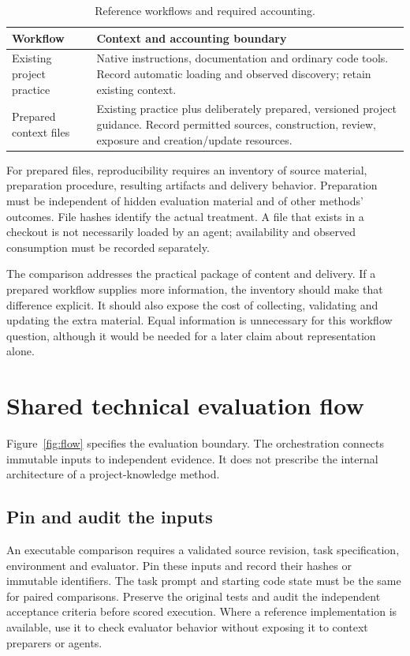 \documentclass[11pt,letterpaper,twocolumn]{article}
\begin{document}
\begin{table}[t]
\caption{Reference workflows and required accounting.}
\label{tab:workflows}
\small
\begin{tabularx}{\columnwidth}{@{}p{}Y@{}}
\toprule
Workflow & Context and accounting boundary \\
\midrule
Existing project practice & Native instructions, documentation and ordinary code tools. Record automatic loading and observed discovery; retain existing context. \\
\addlinespace
Prepared context files & Existing practice plus deliberately prepared, versioned project guidance. Record permitted sources, construction, review, exposure and creation/update resources. \\
\bottomrule
\end{tabularx}
\end{table}

For prepared files, reproducibility requires an inventory of source material, preparation procedure, resulting artifacts and delivery behavior. Preparation must be independent of hidden evaluation material and of other methods' outcomes. File hashes identify the actual treatment. A file that exists in a checkout is not necessarily loaded by an agent; availability and observed consumption must be recorded separately.

The comparison addresses the practical package of content and delivery. If a prepared workflow supplies more information, the inventory should make that difference explicit. It should also expose the cost of collecting, validating and updating the extra material. Equal information is unnecessary for this workflow question, although it would be needed for a later claim about representation alone.

\section{Shared technical evaluation flow}
Figure~\ref{fig:flow} specifies the evaluation boundary. The orchestration connects immutable inputs to independent evidence. It does not prescribe the internal architecture of a project-knowledge method.



\subsection{Pin and audit the inputs}
An executable comparison requires a validated source revision, task specification, environment and evaluator. Pin these inputs and record their hashes or immutable identifiers. The task prompt and starting code state must be the same for paired comparisons. Preserve the original tests and audit the independent acceptance criteria before scored execution. Where a reference implementation is available, use it to check evaluator behavior without exposing it to context preparers or agents.
\end{document}
